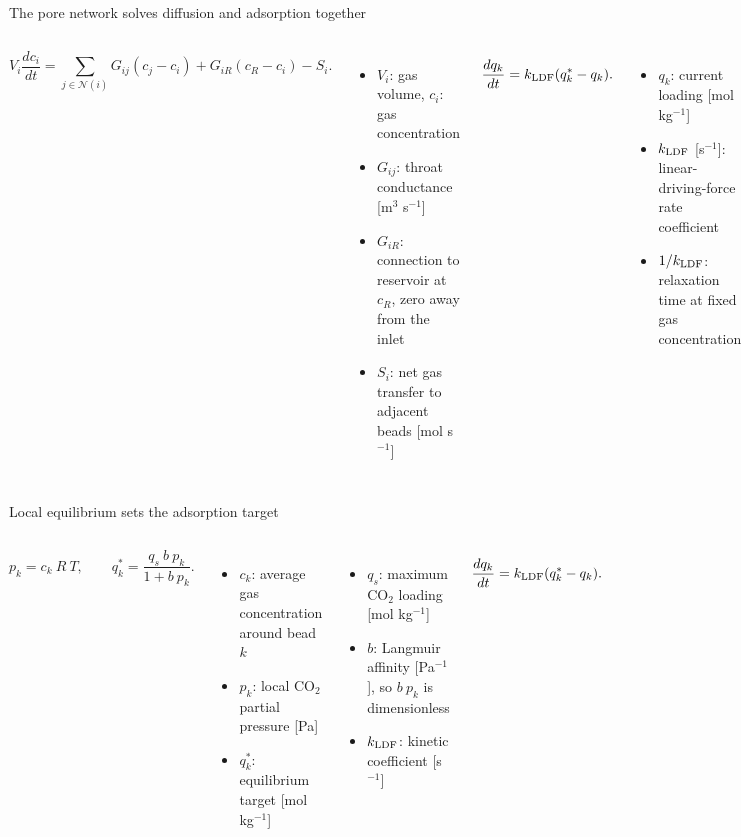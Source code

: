 \begin{frame}{The pore network solves diffusion and adsorption together}

\begin{columns}[T,onlytextwidth]
\small
{}
\[
V_i\frac{dc_i}{dt}=\sum_{j\in\mathcal N(i)}G_{ij}(c_j-c_i)
+G_{iR}(c_R-c_i)-S_i.
\]
\begin{itemize}\setlength{\itemsep}{2pt}
\item $V_i$: gas volume, $c_i$: gas concentration
\item $G_{ij}$: throat conductance [m$^3$ s$^{-1}$]
\item $G_{iR}$: connection to reservoir at $c_R$, zero away from the inlet
\item $S_i$: net gas transfer to adjacent beads [mol s$^{-1}$]
\end{itemize}
\small
{}
\[
\frac{dq_k}{dt}=k_{\rm LDF}(q_k^*-q_k).
\]
\begin{itemize}\setlength{\itemsep}{2pt}
\item $q_k$: current loading [mol kg$^{-1}$]
\item $k_{\rm LDF}$ [s$^{-1}$]: linear-driving-force rate coefficient
\item $1/k_{\rm LDF}$: relaxation time at fixed gas concentration
\end{itemize}
\end{columns}
\vspace{0.15cm}

\end{frame}

\begin{frame}{Local equilibrium sets the adsorption target}
\begin{columns}[T,onlytextwidth]
\small
\[
p_k=c_k\:R\:T,\qquad q_k^*=\frac{q_s\:b\:p_k}{1+b\:p_k}.
\]
\begin{itemize}\setlength{\itemsep}{3pt}
\item $c_k$: average gas concentration around bead $k$
\item $p_k$: local CO$_2$ partial pressure [Pa]
\item $q_k^*$: equilibrium target [mol kg$^{-1}$]
\end{itemize}
\small
\begin{itemize}\setlength{\itemsep}{3pt}
\item $q_s$: maximum CO$_2$ loading [mol kg$^{-1}$]
\item $b$: Langmuir affinity [Pa$^{-1}$], so $b\:p_k$ is dimensionless
\item $k_{\rm LDF}$: kinetic coefficient [s$^{-1}$]
\end{itemize}
\medskip
{}
\[
\frac{dq_k}{dt}=k_{\rm LDF}(q_k^*-q_k).
\]
\end{columns}
\vspace{0.25cm}
\end{frame}


